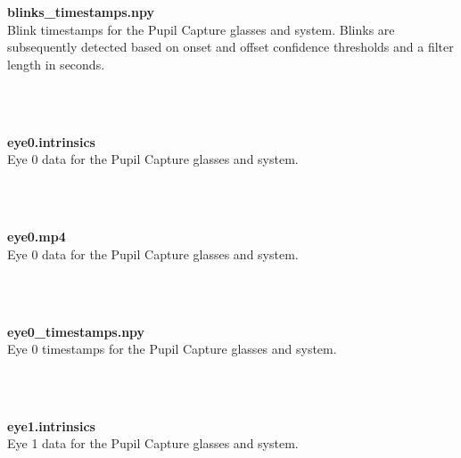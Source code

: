 \begin{description}
\begin{addmargin}[0em]{0em}
    \textbf{\\\\}
    \begin{addmargin}[1em]{0em} %
        \textbf{blinks\_timestamps.npy}\\
        Blink timestamps for the Pupil Capture glasses and system.
        Blinks are subsequently detected based on onset and offset confidence thresholds and a filter length in seconds.
    \end{addmargin} %

    \textbf{\\\\}
    \begin{addmargin}[1em]{0em} %
        \textbf{eye0.intrinsics}\\
        Eye 0 data for the Pupil Capture glasses and system.
    \end{addmargin} %

    \textbf{\\\\}
    \begin{addmargin}[1em]{0em} %
        \textbf{eye0.mp4}\\
        Eye 0 data for the Pupil Capture glasses and system.
    \end{addmargin} %

    \textbf{\\\\}
    \begin{addmargin}[1em]{0em} %
        \textbf{eye0\_timestamps.npy}\\
        Eye 0 timestamps for the Pupil Capture glasses and system.
    \end{addmargin} %

    \textbf{\\\\}
    \begin{addmargin}[1em]{0em} %
        \textbf{eye1.intrinsics}\\
        Eye 1 data for the Pupil Capture glasses and system.
    \end{addmargin} %


\end{addmargin}
\end{description}
